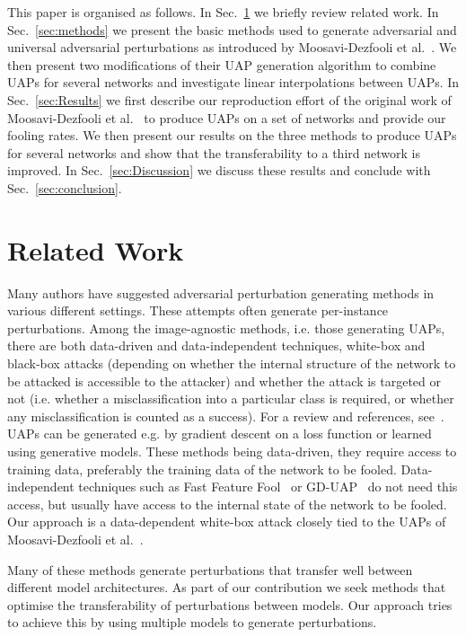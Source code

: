 \documentclass[runningheads]{llncs}
\begin{document}
This paper is organised as follows. In Sec.~\ref{sec:relatedWork} we briefly review related work. In Sec.~\ref{sec:methods} we present the basic methods used to generate adversarial and universal adversarial perturbations as introduced by Moosavi-Dezfooli et al.~\cite{moosavidezfooli_universal_2017}. We then present two modifications of their UAP generation algorithm to combine UAPs for several networks and investigate linear interpolations between UAPs. In Sec.~\ref{sec:Results} we first describe our reproduction effort of the original work of Moosavi-Dezfooli et al.~\cite{moosavidezfooli_universal_2017} to produce UAPs on a set of networks and provide our fooling rates. We then present our results on the three methods to produce UAPs for several networks and show that the transferability to a third network is improved. In Sec.~\ref{sec:Discussion} we discuss these results and conclude with Sec.~\ref{sec:conclusion}.

\section{Related Work}\label{sec:relatedWork}
Many authors have suggested adversarial perturbation generating methods in various different settings. These attempts often generate per-instance perturbations. Among the image-agnostic methods, i.e. those generating UAPs, there are both data-driven and data-independent techniques, white-box and black-box attacks (depending on whether the internal structure of the network to be attacked is accessible to the attacker) and whether the attack is targeted or not (i.e. whether a misclassification into a particular class is required, or whether any misclassification is counted as a success). For a review and references, see~\cite{Chaubey2020UniversalAP}. UAPs can be generated e.g. by gradient descent on a loss function or learned using generative models. These methods being data-driven, they require access to training data, preferably the training data of the network to be fooled. Data-independent techniques such as Fast Feature Fool~\cite{Mopuri2017FastFF} or GD-UAP~\cite{DBLP:journals/corr/abs-1801-08092} do not need this access, but usually have access to the internal state of the network to be fooled. Our approach is a data-dependent white-box attack closely tied to the UAPs of Moosavi-Dezfooli et al.~\cite{moosavidezfooli_universal_2017}.

Many of these methods generate perturbations that transfer well between different model architectures. As part of our contribution we seek methods that optimise the transferability of perturbations between models. Our approach tries to achieve this by using multiple models to generate perturbations.
\end{document}
